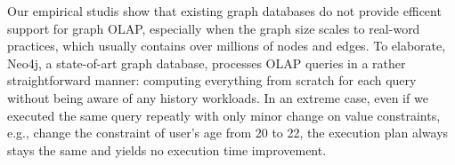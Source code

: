 Our empirical studis show that existing graph databases do not provide efficent support for graph OLAP, especially when the graph size scales to real-word practices, which usually contains over millions of nodes and edges. %
To elaborate, Neo4j, a state-of-art graph database, processes OLAP queries in a rather straightforward manner: computing everything from scratch for each query without being aware of any history workloads. In an extreme case, even if we executed the same query repeatly with only minor change on value constraints, e.g., change the constraint of user's age from 20 to 22, the execution plan always stays the same and yields no execution time improvement.  

